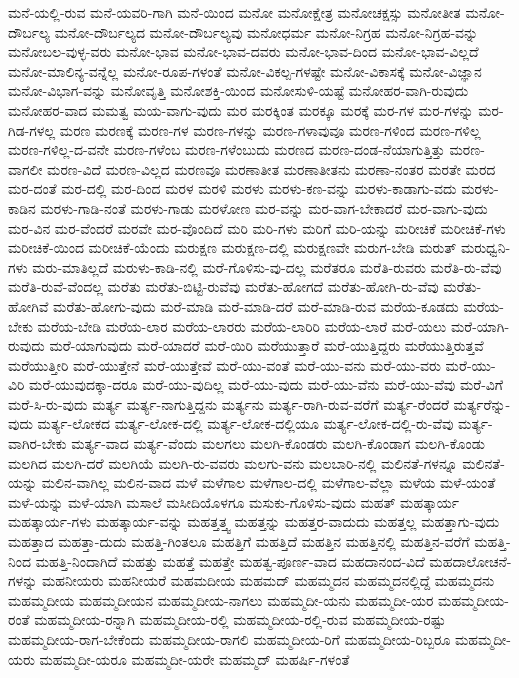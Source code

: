 {ಮನೆ-ಯಲ್ಲಿ-ರುವ
ಮನೆ-ಯವರಿ-ಗಾಗಿ
ಮನೆ-ಯಿಂದ
ಮನೋ
ಮನೋಕ್ಷೇತ್ರ
ಮನೋಚಕ್ಷಸ್ಸು
ಮನೋತೀತ
ಮನೋ-ದೌರ್ಬಲ್ಯ
ಮನೋ-ದೌರ್ಬಲ್ಯದ
ಮನೋ-ದೌರ್ಬಲ್ಯವು
ಮನೋಧರ್ಮ
ಮನೋ-ನಿಗ್ರಹ
ಮನೋ-ನಿಗ್ರಹ-ವನ್ನು
ಮನೋಬಲ-ವುಳ್ಳ-ವರು
ಮನೋ-ಭಾವ
ಮನೋ-ಭಾವ-ದವರು
ಮನೋ-ಭಾವ-ದಿಂದ
ಮನೋ-ಭಾವ-ವಿಲ್ಲದೆ
ಮನೋ-ಮಾಲಿನ್ಯ-ವನ್ನೆಲ್ಲ
ಮನೋ-ರೂಪ-ಗಳಂತೆ
ಮನೋ-ವಿಕಲ್ಪ-ಗಳಷ್ಟೇ
ಮನೋ-ವಿಕಾಸಕ್ಕೆ
ಮನೋ-ವಿಜ್ಞಾನ
ಮನೋ-ವಿಭಾಗ-ವನ್ನು
ಮನೋವೃತ್ತಿ
ಮನೋಶಕ್ತಿ-ಯಿಂದ
ಮನೋಸುಳಿ-ಯಷ್ಟೆ
ಮನೋಹರ-ವಾಗಿ-ರುವುದು
ಮನೋಹರ-ವಾದ
ಮಮತ್ವ
ಮಯ-ವಾಗು-ವುದು
ಮರ
ಮರಕ್ಕಿಂತ
ಮರಕ್ಕೂ
ಮರಕ್ಕೆ
ಮರ-ಗಳ
ಮರ-ಗಳನ್ನು
ಮರ-ಗಿಡ-ಗಳಲ್ಲ
ಮರಣ
ಮರಣಕ್ಕೆ
ಮರಣ-ಗಳ
ಮರಣ-ಗಳನ್ನು
ಮರಣ-ಗಳಾವುವೂ
ಮರಣ-ಗಳಿಂದ
ಮರಣ-ಗಳಿಲ್ಲ
ಮರಣ-ಗಳಿಲ್ಲ-ದ-ವನೇ
ಮರಣ-ಗಳೆಂಬ
ಮರಣ-ಗಳೆಂಬುದು
ಮರಣದ
ಮರಣ-ದಂಡ-ನೆಯಾಗುತ್ತಿತ್ತು
ಮರಣ-ವಾಗಲೀ
ಮರಣ-ವಿದೆ
ಮರಣ-ವಿಲ್ಲದ
ಮರಣವೂ
ಮರಣಾತೀತ
ಮರಣಾತೀತನು
ಮರಣಾ-ನಂತರ
ಮರತೇ
ಮರದ
ಮರ-ದಂತೆ
ಮರ-ದಲ್ಲಿ
ಮರ-ದಿಂದ
ಮರಳ
ಮರಳಿ
ಮರಳು
ಮರಳು-ಕಣ-ವನ್ನು
ಮರಳು-ಕಾಡಾಗು-ವದು
ಮರಳು-ಕಾಡಿನ
ಮರಳು-ಗಾಡಿ-ನಂತೆ
ಮರಳು-ಗಾಡು
ಮರಳೋಣ
ಮರ-ವನ್ನು
ಮರ-ವಾಗ-ಬೇಕಾದರೆ
ಮರ-ವಾಗು-ವುದು
ಮರ-ವಿನ
ಮರ-ವೆಂದರೆ
ಮರವೇ
ಮರ-ವೊಂದಿದೆ
ಮರಿ
ಮರಿ-ಗಳು
ಮರಿಗೆ
ಮರಿ-ಯನ್ನು
ಮರೀಚಿಕೆ
ಮರೀಚಿಕೆ-ಗಳು
ಮರೀಚಿಕೆ-ಯಿಂದ
ಮರೀಚಿಕೆ-ಯೆಂದು
ಮರುಕ್ಷಣ
ಮರುಕ್ಷಣ-ದಲ್ಲಿ
ಮರುಕ್ಷಣವೇ
ಮರುಗ-ಬೇಡಿ
ಮರುತ್
ಮರುಧ್ವನಿ-ಗಳು
ಮರು-ಮಾತಿಲ್ಲದೆ
ಮರುಳು-ಕಾಡಿ-ನಲ್ಲಿ
ಮರೆ-ಗೊಳಿಸು-ವು-ದಲ್ಲ
ಮರೆತರೂ
ಮರೆತಿ-ರುವರು
ಮರೆತಿ-ರು-ವೆವು
ಮರೆತಿ-ರುವೆ-ವೆಂದಲ್ಲ
ಮರೆತು
ಮರೆತು-ಬಿಟ್ಟಿ-ರುವೆವು
ಮರೆತು-ಹೋಗದೆ
ಮರೆತು-ಹೋಗಿ-ರು-ವೆವು
ಮರೆತು-ಹೋಗಿವೆ
ಮರೆತು-ಹೋಗು-ವುದು
ಮರೆ-ಮಾಡಿ
ಮರೆ-ಮಾಡಿ-ದರೆ
ಮರೆ-ಮಾಡಿ-ರುವ
ಮರೆಯ-ಕೂಡದು
ಮರೆಯ-ಬೇಕು
ಮರೆಯ-ಬೇಡಿ
ಮರೆಯ-ಲಾರ
ಮರೆಯ-ಲಾರರು
ಮರೆಯ-ಲಾರಿರಿ
ಮರೆಯ-ಲಾರೆ
ಮರೆ-ಯಲು
ಮರೆ-ಯಾಗಿ-ರುವುದು
ಮರೆ-ಯಾಗುವುದು
ಮರೆ-ಯಾದರೆ
ಮರೆ-ಯಿರಿ
ಮರೆಯುತ್ತಾರೆ
ಮರೆ-ಯುತ್ತಿದ್ದರು
ಮರೆಯುತ್ತಿರುತ್ತವೆ
ಮರೆಯುತ್ತೀರಿ
ಮರೆ-ಯುತ್ತೇನೆ
ಮರೆ-ಯುತ್ತೇವೆ
ಮರೆ-ಯು-ವಂತೆ
ಮರೆ-ಯು-ವನು
ಮರೆ-ಯು-ವರು
ಮರೆ-ಯು-ವಿರಿ
ಮರೆ-ಯುವುದಕ್ಕಾ-ದರೂ
ಮರೆ-ಯು-ವುದಿಲ್ಲ
ಮರೆ-ಯು-ವುದು
ಮರೆ-ಯು-ವೆನು
ಮರೆ-ಯು-ವೆವು
ಮರೆ-ವಿಗೆ
ಮರೆ-ಸಿ-ರು-ವುದು
ಮರ್ತ್ಯ
ಮರ್ತ್ಯ-ನಾಗುತ್ತಿದ್ದನು
ಮರ್ತ್ಯನು
ಮರ್ತ್ಯ-ರಾಗಿ-ರುವ-ವರೆಗೆ
ಮರ್ತ್ಯ-ರೆಂದರೆ
ಮರ್ತ್ಯರೆನ್ನು-ವುದು
ಮರ್ತ್ಯ-ಲೋಕದ
ಮರ್ತ್ಯ-ಲೋಕ-ದಲ್ಲಿ
ಮರ್ತ್ಯ-ಲೋಕ-ದಲ್ಲಿಯೂ
ಮರ್ತ್ಯ-ಲೋಕ-ದಲ್ಲಿ-ರು-ವೆವು
ಮರ್ತ್ಯ-ವಾಗಿರ-ಬೇಕು
ಮರ್ತ್ಯ-ವಾದ
ಮರ್ತ್ಯ-ವೆಂದು
ಮಲಗಲು
ಮಲಗಿ-ಕೊಂಡರು
ಮಲಗಿ-ಕೊಂಡಾಗ
ಮಲಗಿ-ಕೊಂಡು
ಮಲಗಿದ
ಮಲಗಿ-ದರೆ
ಮಲಗಿಯೆ
ಮಲಗಿ-ರು-ವವರು
ಮಲಗು-ವನು
ಮಲಬಾರಿ-ನಲ್ಲಿ
ಮಲಿನತೆ-ಗಳನ್ನೂ
ಮಲಿನತೆ-ಯನ್ನು
ಮಲಿನ-ವಾಗಿಲ್ಲ
ಮಲಿನ-ವಾದ
ಮಳೆ
ಮಳೆಗಾಲ
ಮಳೆಗಾಲ-ದಲ್ಲಿ
ಮಳೆಗಾಲ-ವೆಲ್ಲಾ
ಮಳೆಯ
ಮಳೆ-ಯಂತೆ
ಮಳೆ-ಯನ್ನು
ಮಳೆ-ಯಾಗಿ
ಮಸಾಲೆ
ಮಸೀದಿಯೊಳಗೂ
ಮಸುಕು-ಗೊಳಿಸು-ವುದು
ಮಹತ್
ಮಹತ್ಕಾರ್ಯ
ಮಹತ್ಕಾರ್ಯ-ಗಳು
ಮಹತ್ಕಾರ್ಯ-ವನ್ನು
ಮಹತ್ತತ್ತ್ವ
ಮಹತ್ತನ್ನು
ಮಹತ್ತರ-ವಾದುದು
ಮಹತ್ತಲ್ಲ
ಮಹತ್ತಾಗು-ವುದು
ಮಹತ್ತಾದ
ಮಹತ್ತಾ-ದುದು
ಮಹತ್ತಿ-ಗಿಂತಲೂ
ಮಹತ್ತಿಗೆ
ಮಹತ್ತಿದೆ
ಮಹತ್ತಿನ
ಮಹತ್ತಿನಲ್ಲಿ
ಮಹತ್ತಿನ-ವರೆಗೆ
ಮಹತ್ತಿ-ನಿಂದ
ಮಹತ್ತಿ-ನಿಂದಾಗಿದೆ
ಮಹತ್ತು
ಮಹತ್ತೆ
ಮಹತ್ತೇ
ಮಹತ್ವ-ಪೂರ್ಣ-ವಾದ
ಮಹದಾನಂದ-ವಿದೆ
ಮಹದಾಲೋಚನೆ-ಗಳನ್ನು
ಮಹನೀಯರು
ಮಹನೀಯರೆ
ಮಹಮದೀಯ
ಮಹಮದ್
ಮಹಮ್ಮದನ
ಮಹಮ್ಮದನಲ್ಲಿದ್ದೆ
ಮಹಮ್ಮದನು
ಮಹಮ್ಮದೀಯ
ಮಹಮ್ಮದೀಯನ
ಮಹಮ್ಮದೀಯ-ನಾಗಲು
ಮಹಮ್ಮದೀ-ಯನು
ಮಹಮ್ಮದೀ-ಯರ
ಮಹಮ್ಮದೀಯ-ರಂತೆ
ಮಹಮ್ಮದೀಯ-ರನ್ನಾಗಿ
ಮಹಮ್ಮದೀಯ-ರಲ್ಲಿ
ಮಹಮ್ಮದೀಯ-ರಲ್ಲಿ-ರುವ
ಮಹಮ್ಮದೀಯ-ರಷ್ಟು
ಮಹಮ್ಮದೀಯ-ರಾಗ-ಬೇಕೆಂದು
ಮಹಮ್ಮದೀಯ-ರಾಗಲಿ
ಮಹಮ್ಮದೀಯ-ರಿಗೆ
ಮಹಮ್ಮದೀಯ-ರಿಬ್ಬರೂ
ಮಹಮ್ಮದೀ-ಯರು
ಮಹಮ್ಮದೀ-ಯರೂ
ಮಹಮ್ಮದೀ-ಯರೇ
ಮಹಮ್ಮದ್
ಮಹರ್ಷಿ-ಗಳಂತೆ
}
